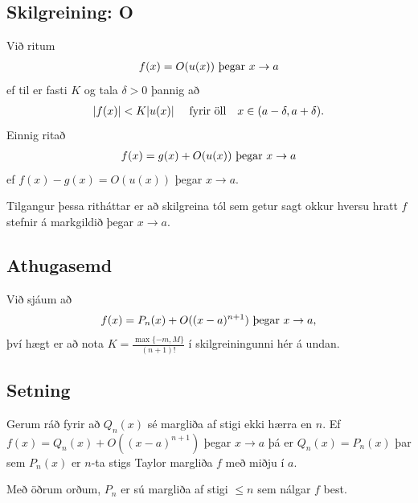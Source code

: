 \documentclass[a4paper,10pt,icelandic]{sphinxmanual}
\begin{document}
\subsection{Skilgreining: O}
\label{kafli03:index-14}\label{kafli03:skilgreining-o}
Við ritum
\begin{gather}
\begin{split}f(x)=O(u(x)) \mbox{ þegar } x\rightarrow a\end{split}\notag
\end{gather}
ef til er fasti \(K\) og tala \(\delta>0\) þannig að
\begin{gather}
\begin{split}|f(x)|<K|u(x)|\quad\mbox{ fyrir öll}\quad x\in(a-\delta, a+\delta).\end{split}\notag
\end{gather}
Einnig ritað
\begin{gather}
\begin{split}f(x)=g(x)+O(u(x)) \mbox{ þegar }x\rightarrow a\end{split}\notag
\end{gather}
ef \(f(x)-g(x)=O(u(x))\) þegar \(x\rightarrow a\).

Tilgangur þessa ritháttar er að skilgreina tól sem getur sagt okkur
hversu hratt \(f\) stefnir á markgildið þegar \(x\to a\).


\subsection{Athugasemd}
\label{kafli03:id21}
Við sjáum að
\begin{gather}
\begin{split}f(x) = P_n(x) + O((x-a)^{n+1}) \mbox{ þegar } x\rightarrow a,\end{split}\notag
\end{gather}
því hægt er að nota \(K = \frac{\max\{-m,M\}}{(n+1)!}\) í skilgreiningunni
hér á undan.


\subsection{Setning}
\label{kafli03:id22}
Gerum ráð fyrir að \(Q_n(x)\) sé margliða af stigi ekki hærra en
\(n\). Ef \(f(x)=Q_n(x)+O((x-a)^{n+1})\) þegar
\(x\rightarrow a\) þá er \(Q_n(x)=P_n(x)\) þar sem
\(P_n(x)\) er \(n\)-ta stigs Taylor margliða \(f\) með miðju
í \(a\).

Með öðrum orðum, \(P_n\) er sú margliða af stigi \(\leq n\) sem
nálgar \(f\) best.
\end{document}
